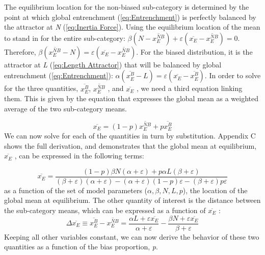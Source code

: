 The equilibrium location for the non-biased sub-category is determined
by the point at which global entrenchment (\ref{eq:Entrenchment})
is perfectly balanced by the attractor at \emph{N} (\ref{eq:Inertia Force}).
Using the equilibrium location of the mean to stand in for the entire
sub-category: $\beta(N-\overline{x_{E}^{NB}})+\varepsilon(\overline{x_{E}}-\overline{x_{E}^{NB}})=0$.
Therefore, $\beta(\overline{x_{E}^{NB}}-N)=\varepsilon(\overline{x_{E}}-\overline{x_{E}^{NB}})$.
For the biased distribution, it is the attractor at \emph{L} (\ref{eq:Length Attractor})
that will be balanced by global entrenchment (\ref{eq:Entrenchment}):
$\alpha(\overline{x_{E}^{B}}-L)=\varepsilon(\overline{x_{E}}-\overline{x_{E}^{B}})$.
In order to solve for the three quantities, $\overline{x_{E}^{B}}$,
$\overline{x_{E}^{NB}}$ , and $\overline{x_{E}}$ , we need a third
equation linking them. This is given by the equation that expresses
the global mean as a weighted average of the two sub-category means.

\begin{equation}
\overline{x_{E}}=(1-p)\overline{x_{E}^{NB}}+p\overline{x_{E}^{B}}\label{eq:weighted mean}
\end{equation}
We can now solve for each of the quantities in turn by substitution.
Appendix C shows the full derivation, and demonstrates that the global
mean at equilibrium, $\overline{x_{E}}$ , can be expressed in the
following terms:

\begin{equation}
\overline{x_{E}}=\frac{(1-p)\beta N(\alpha+\varepsilon)+p\alpha L(\beta+\varepsilon)}{(\beta+\varepsilon)(\alpha+\varepsilon)-(\alpha+\varepsilon)(1-p)\varepsilon-(\beta+\varepsilon)p\varepsilon}\label{eq: sub-dist}
\end{equation}
as a function of the set of model parameters ($\alpha,\beta,N,L,p$),
the location of the global mean at equilibrium. The other quantity
of interest is the distance between the sub-category means, which
can be expressed as a function of $\overline{x_{E}}$ :
\begin{equation}
\Delta\overline{x_{E}}\equiv\overline{x_{E}^{B}}-\overline{x_{E}^{NB}}=\frac{\alpha L+\varepsilon\overline{x_{E}}}{\alpha+\varepsilon}-\frac{\beta N+\varepsilon\overline{x_{E}}}{\beta+\varepsilon}\label{eq:State Model-sep}
\end{equation}
Keeping all other variables constant, we can now derive the behavior
of these two quantities as a function of the bias proportion, \emph{p}. 

